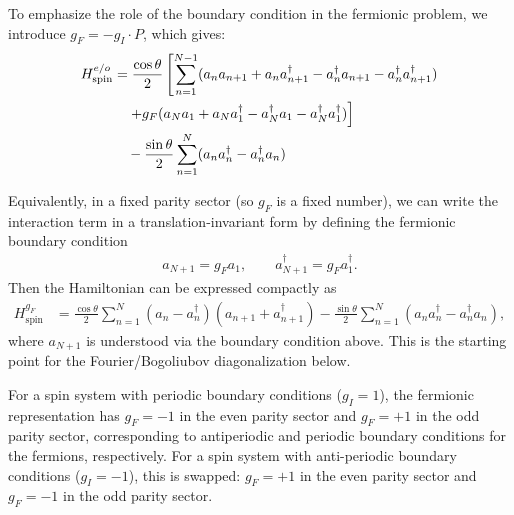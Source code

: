 \documentclass[aps,prx,twocolumn,superscriptaddress,nofootinbib,nolongbibliography,nobalancelastpage,10pt,floatfix]{revtex4-2}
\begin{document}
To emphasize the role of the boundary condition in the fermionic problem, we introduce $g_F = -g_I \cdot P$, which gives:
\begin{align}
    H_{\mathrm{spin}}^{e/o} &= \frac{\cos\theta}{2} \left[\sum_{n=1}^{N-1} (a_n a_{n+1} + a_n a_{n+1}^\dag - a_n^\dag a_{n+1} - a_n^\dag a_{n+1}^\dag) \right. \nonumber\\
                            &\quad \left. + g_F (a_N a_1 + a_N a_1^\dag - a_N^\dag a_1 - a_N^\dag a_1^\dag)\right] \nonumber\\
                            &\quad -\frac{\sin\theta}{2} \sum_{n=1}^N (a_n a_n^\dag - a_n^\dag a_n)
\end{align}

Equivalently, in a fixed parity sector (so $g_F$ is a fixed number), we can write the interaction term in a translation-invariant form by defining
the fermionic boundary condition
\begin{align}
    a_{N+1} = g_F a_1,\qquad a_{N+1}^\dag = g_F a_1^\dag.
\end{align}
Then the Hamiltonian can be expressed compactly as
\begin{align}
    H_{\mathrm{spin}}^{g_F}
    &= \frac{\cos\theta}{2}\sum_{n=1}^{N} (a_n-a_n^\dag)(a_{n+1}+a_{n+1}^\dag)
    -\frac{\sin\theta}{2}\sum_{n=1}^{N} (a_n a_n^\dag - a_n^\dag a_n),
    \label{eq:H_ferm_realspace}
\end{align}
where $a_{N+1}$ is understood via the boundary condition above. This is the starting point for the Fourier/Bogoliubov diagonalization below.


For a spin system with periodic boundary conditions ($g_I = 1$), the fermionic representation has $g_F = -1$ in the even parity sector and $g_F = +1$ in the odd parity sector, corresponding to antiperiodic and periodic boundary conditions for the fermions, respectively.
For a spin system with anti-periodic boundary conditions ($g_I=-1$), this is swapped: $g_F=+1$ in the even parity sector and $g_F=-1$ in the odd parity sector.
\end{document}

